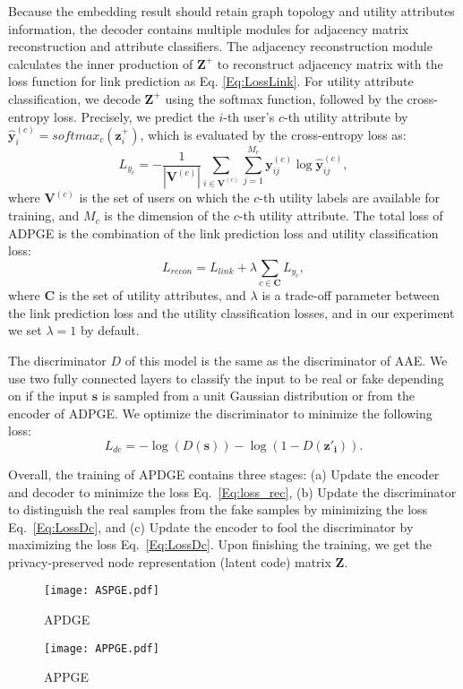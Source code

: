 \documentclass{article}
\begin{document}
Because the embedding result should retain graph topology and utility attributes information, the decoder contains multiple modules for adjacency matrix reconstruction and attribute classifiers. The adjacency reconstruction module calculates the inner production of $\mathbf{Z^+}$ to reconstruct adjacency matrix with the loss function for link prediction as Eq. \ref{Eq:LossLink}. For utility attribute classification, we decode $\mathbf{Z^+}$ using the softmax function, followed by the cross-entropy loss. Precisely, we predict the $i$-th user's $c$-th utility attribute by $\mathbf{\hat{y}}_i^{(c)} = softmax_c(\mathbf{z}_i^+)$, which is evaluated by the cross-entropy loss as:
\begin{equation}
L_{y_c} = -\frac{1}{|\mathbf{V}^{(c)}|}\sum_{i \in \mathbf{V}^{(c)}}\sum_{j=1}^{M_c}\mathbf{y}^{(c)}_{ij}\log\mathbf{\hat{y}}^{(c)}_{ij},
\label{Eq:LossAttr}
\end{equation}
where $\mathbf{V}^{(c)}$ is the set of users on which the $c$-th utility labels are available for training, and  $M_c$ is the dimension of the  $c$-th utility attribute. The total loss of ADPGE is the combination of the link prediction loss and utility classification loss:
\begin{equation}\label{Eq:loss_rec}
L_{recon} = L_{link} + \lambda\sum_{c \in \mathbf{C}} L_{y_c},
\end{equation}
where $\mathbf{C}$ is the set of  utility attributes, and $\lambda$ is a trade-off parameter between the link prediction loss and the utility classification losses, and in our experiment we set $\lambda=1$ by default.

The discriminator $D$ of this model is the same as the discriminator of AAE. We use two fully connected layers to classify the input to be real or fake depending on if the input $\mathbf{s}$ is sampled from a unit Gaussian distribution or from the encoder of ADPGE. We optimize the discriminator to minimize the following loss:
\begin{equation}
L_{dc} = - \log(D(\mathbf{s})) - \log(1-D(\mathbf{z'_i})).
\label{Eq:LossDc}
\end{equation}

Overall, the training of APDGE contains three stages: (a) Update the encoder and decoder to minimize the loss Eq.~\ref{Eq:loss_rec}, (b) Update the discriminator to distinguish the real samples from the fake samples by minimizing the loss Eq.~\ref{Eq:LossDc}, and (c) Update the encoder to fool the discriminator by maximizing the loss Eq.~\ref{Eq:LossDc}. Upon finishing the training, we get the privacy-preserved node representation (latent code) matrix $\mathbf{Z}$.
\begin{figure}[htbp]
\centering
\begin{minipage}[t]{0.48\textwidth}
\centering \texttt{[image: ASPGE.pdf]}
\caption{APDGE}
\label{Fig:ASGE}
\end{minipage}
\begin{minipage}[t]{0.48\textwidth}
\centering
\texttt{[image: APPGE.pdf]}
\caption{APPGE}
\label{Fig:APGE}
\end{minipage}
\end{figure}
\end{document}
